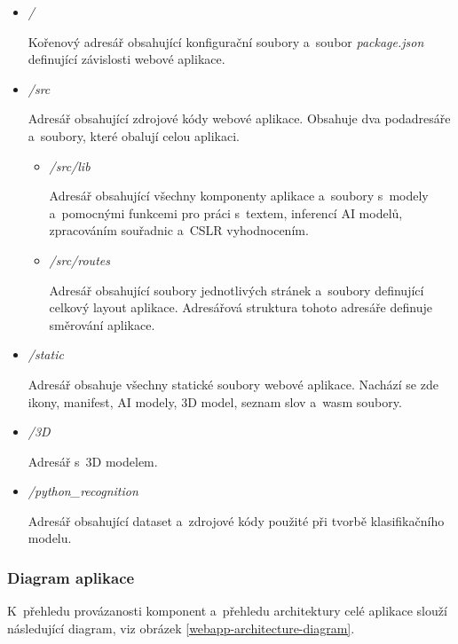 \documentclass[
  master,
  program=ainfvs,
  biblatex,
  figures=true,
  tables=false,
  sourcecodes=true,
  glossaries,
  index
]{kidiplom}
\begin{document}
            \begin{itemize}
                \item \emph{/} \par
                    Kořenový adresář obsahující konfigurační soubory a~soubor \emph{package.json} definující závislosti webové aplikace.
                    
                \item \emph{/src} \par
                    Adresář obsahující zdrojové kódy webové aplikace. Obsahuje dva podadresáře a~soubory, které obalují celou aplikaci.
                    \begin{itemize}
                        \item \emph{/src/lib} \par
                            Adresář obsahující všechny komponenty aplikace a~soubory s~modely a~pomocnými funkcemi pro práci s~textem, inferencí AI modelů, zpracováním souřadnic a~CSLR vyhodnocením.
                        \item \emph{/src/routes} \par
                            Adresář obsahující soubory jednotlivých stránek a~soubory definující celkový layout aplikace. Adresářová struktura tohoto adresáře definuje směrování aplikace.
                    \end{itemize}
                    
                \item \emph{/static} \par
                    Adresář obsahuje všechny statické soubory webové aplikace. Nachází se zde ikony, manifest, AI modely, 3D model, seznam slov a~wasm soubory.

                \item \emph{/3D} \par
                    Adresář s~3D modelem.
                    
                \item \emph{/python\_recognition} \par
                   Adresář obsahující dataset a~zdrojové kódy použité při tvorbě klasifikačního modelu.
            \end{itemize}
         
        \subsubsection{Diagram aplikace}
            K~přehledu provázanosti komponent a~přehledu architektury celé aplikace slouží následující diagram, viz obrázek \ref{webapp-architecture-diagram}.
\end{document}
